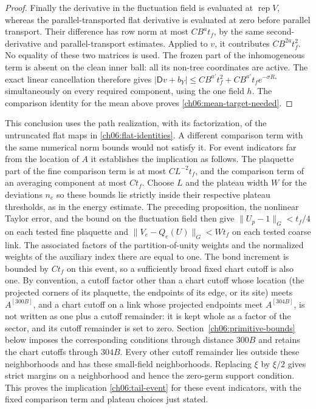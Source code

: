 \begin{proof}
Finally the derivative in the fluctuation field is evaluated at $\operatorname{rep}V$,
whereas the parallel-transported flat derivative is evaluated at zero before
parallel transport. Their difference has row norm at most
$C B^a t_f$, by the same second-derivative and parallel-transport estimates.
Applied to $v$, it contributes $C B^{2a}t_f^2$. No equality of these two
matrices is used. The frozen part of the inhomogeneous term is absent on the clean inner ball:
all its non-tree coordinates are active. The exact linear cancellation
therefore gives
$|\mathsf Dv+b_Y|\le C B^{a'}t_f^2+
 C B^{a'}t_f e^{-\sigma R_*}$ simultaneously on every required component,
using the one field $h$. The comparison identity for the mean above proves
\eqref{ch06:mean-target-needed}.
\end{proof}

This conclusion uses the path realization, with its factorization, of the untruncated flat maps in
\eqref{ch06:flat-identities}. A different comparison term with the same numerical
norm bounds would not satisfy it. For event indicators far from the location of $A$ it establishes the
implication as follows. The plaquette part of the fine comparison term is at most
$C L^{-2}t_f$, and the comparison term of an averaging component at most $C t_f$.
Choose $L$ and the plateau width $W$ for the deviations $n_e$ so these bounds lie
strictly inside their respective plateau thresholds, as in the energy
estimate. The preceding proposition, the nonlinear Taylor error, and
the bound on the fluctuation field then give $\|U_p-1\|_G<t_f/4$ on each tested fine
plaquette and $\|V_e-Q_e(U)\|_G<Wt_f$ on each tested coarse link.
The associated factors of the partition-of-unity weights and the
normalized weights of the auxiliary index there are equal to one. The bond increment is bounded
by $Ct_f$ on this event, so a sufficiently broad fixed chart cutoff is
also one. By convention, a cutoff factor other than a chart cutoff whose location (the projected corners of its plaquette, the endpoints of its edge, or its site) meets $A^{[300B]}$, and a chart cutoff on a link whose projected endpoints meet $A^{[304B]}$, is not written as one plus a cutoff remainder: it is kept whole as a factor of the sector, and its cutoff remainder is set to zero. Section~\ref{ch06:primitive-bounds} below imposes the corresponding conditions through distance $300B$ and retains the chart cutoffs through $304B$. Every other cutoff remainder lies outside these neighborhoods and has these small-field neighborhoods.
Replacing $\xi$ by $\xi/2$ gives strict margins on a neighborhood and
hence the zero-germ support condition. This proves the implication
\eqref{ch06:tail-event} for these event indicators, with the fixed comparison term
and plateau choices just stated.

